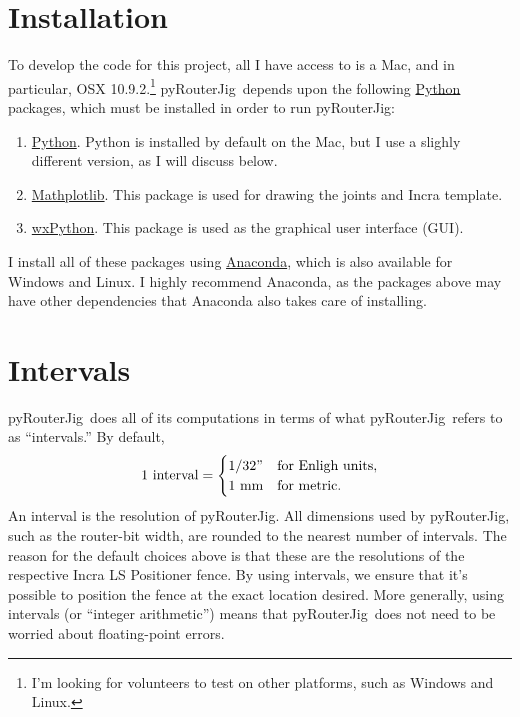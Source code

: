 \documentclass[12pt,final]{article}
\newcommand{\codename}[0]{pyRouterJig}
\begin{document}
\section{Installation}

To develop the code for this project, all I have access to is a Mac, and in
particular, OSX 10.9.2.\footnote{I'm looking for volunteers to test on other
  platforms, such as Windows and Linux.}  \codename~depends upon the following
\href{http://www.python.org}{Python} packages, which must be installed in
order to run \codename:
\begin{enumerate}
\item \href{http://www.python.org}{Python}.  Python is installed by default on
  the Mac, but I use a slighly different version, as I will discuss below.
\item \href{http://www.matplotlib.org}{Mathplotlib}.  This package is used for
  drawing the joints and Incra template.
\item \href{http://www.wxpython.org}{wxPython}.  This package is used as the
  graphical user interface (GUI).
\end{enumerate}
I install all of these packages using
\href{http://www.anaconda.org}{Anaconda}, which is also available for Windows
and Linux.  I highly recommend Anaconda, as the packages above may have other
dependencies that Anaconda also takes care of installing.

\section{Intervals}

\codename~does all of its computations in terms of what \codename~refers to
as ``intervals.''  By default,
\begin{equation*}
  \text{1 interval} =
  \begin{cases}
    1/32" & \text{for Enligh units},\\
    1 \text{~mm} & \text{for metric}.
  \end{cases}
\end{equation*}
An interval is the resolution of \codename.  All dimensions used by \codename,
such as the router-bit width, are rounded to the nearest number of intervals.
The reason for the default choices above is that these are the resolutions of
the respective Incra LS Positioner fence.  By using intervals, we ensure that it's
possible to position the fence at the exact location desired.  More generally, using
intervals (or ``integer arithmetic'') means that \codename~does not need to be
worried about floating-point errors.
\end{document}
